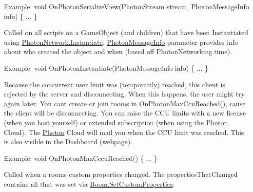 \begin{Desc}
\begin{description}
Example\+: void On\+Photon\+Serialize\+View(\+Photon\+Stream stream, Photon\+Message\+Info info) \{ ... \} \item[{\em 
On\+Photon\+Instantiate\hypertarget{group__public_api_ggaf30bbea51cc8c4b1ddc239d1c5c1468faa8bb589bf7df8d2be1f0b4b586ba8001}{}\label{group__public_api_ggaf30bbea51cc8c4b1ddc239d1c5c1468faa8bb589bf7df8d2be1f0b4b586ba8001}
}]Called on all scripts on a Game\+Object (and children) that have been Instantiated using \hyperlink{class_photon_network_a843d9f62d28ab123c83291c1e6bb857d}{Photon\+Network.\+Instantiate}. \hyperlink{class_photon_message_info}{Photon\+Message\+Info} parameter provides info about who created the object and when (based off Photon\+Networking.\+time).

Example\+: void On\+Photon\+Instantiate(\+Photon\+Message\+Info info) \{ ... \} \item[{\em 
On\+Photon\+Max\+Cccu\+Reached\hypertarget{group__public_api_ggaf30bbea51cc8c4b1ddc239d1c5c1468fa1d2567b2c2f8ec1799a293b0359b4046}{}\label{group__public_api_ggaf30bbea51cc8c4b1ddc239d1c5c1468fa1d2567b2c2f8ec1799a293b0359b4046}
}]Because the concurrent user limit was (temporarily) reached, this client is rejected by the server and disconnecting. When this happens, the user might try again later. You can\textquotesingle{}t create or join rooms in On\+Photon\+Max\+Ccu\+Reached(), cause the client will be disconnecting. You can raise the C\+CU limits with a new license (when you host yourself) or extended subscription (when using the \hyperlink{namespace_photon}{Photon} Cloud). The \hyperlink{namespace_photon}{Photon} Cloud will mail you when the C\+CU limit was reached. This is also visible in the Dashboard (webpage).

Example\+: void On\+Photon\+Max\+Cccu\+Reached() \{ ... \} \item[{\em 
On\+Photon\+Custom\+Room\+Properties\+Changed\hypertarget{group__public_api_ggaf30bbea51cc8c4b1ddc239d1c5c1468fafbc17ce96afe80127d732de2d4be0378}{}\label{group__public_api_ggaf30bbea51cc8c4b1ddc239d1c5c1468fafbc17ce96afe80127d732de2d4be0378}
}]Called when a room\textquotesingle{}s custom properties changed. The properties\+That\+Changed contains all that was set via \hyperlink{class_room_a9f8ac164f4f24be4140221b72792250a}{Room.\+Set\+Custom\+Properties}. 


\end{description}
\end{Desc}
